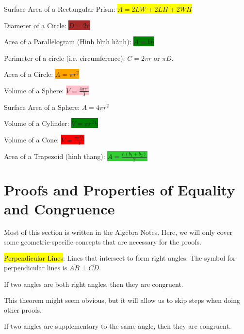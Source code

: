 Surface Area of a Rectangular Prism: \colorbox{yellow}{$A=2LW+2LH+2WH$}

Diameter of a Circle: \colorbox{brown}{$D=2r$}

Area of a Parallelogram (Hình bình hành): \colorbox{green}{$A=bh$}

Perimeter of a circle (i.e. circumference): \colorbox{VioletRed}{$C=2\pi r$} or \colorbox{VioletRed}{$\pi D$}.

Area of a Circle: \colorbox{orange}{$A=\pi r^{2}$}

Volume of a Sphere: \colorbox{pink}{$V=\frac{4\pi r^{3}}{3}$}

Surface Area of a Sphere: \colorbox{BlueGreen}{$A=4\pi r^{2}$}

Volume of a Cylinder: \colorbox{green}{$V=\pi r^{2}h$}

Volume of a Cone: \colorbox{red}{$V=\frac{\pi r^{2}h}{3}$}

Area of a Trapezoid (hình thang): \colorbox{LimeGreen}{$A=\frac{h(b_{1}+b_{2})}{2}$}

\section{Proofs and Properties of Equality and Congruence}

Most of this section is written in the Algebra Notes. Here, we will only cover some geometric-specific concepts that are necessary for the proofs.

\hl{Perpendicular Lines}: Lines that intersect to form right angles. The symbol for perpendicular lines is $\overline{AB} \perp \overline{CD}$.

\vspace{.5cm}

\begin{tcolorbox}[colback=red!5!white,colframe=red!75!black,title=Right Angle Congruence Theorem]
  If two angles are both right angles, then they are congruent. 
\end{tcolorbox}

This theorem might seem obvious, but it will allow us to skip steps when doing other proofs.

\vspace{.5cm}

\begin{tcolorbox}[colback=OrangeRed!5!white,colframe=OrangeRed!75!black,title=Congruent Supplements Theorem]
  If two angles are supplementary to the same angle, then they are congruent.
\end{tcolorbox}

